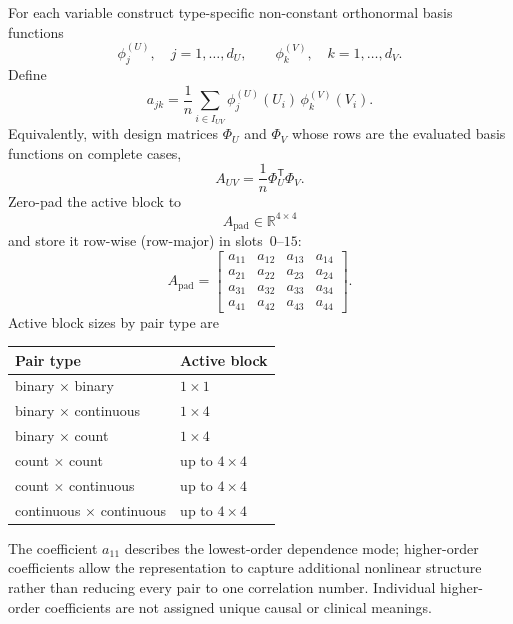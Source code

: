 For each variable construct type-specific non-constant orthonormal basis functions
\begin{equation}
\phi^{(U)}_{j},\quad j=1,\ldots,d_{U},
\qquad
\phi^{(V)}_{k},\quad k=1,\ldots,d_{V}.
\end{equation}
Define
\begin{equation}
\label{eq:app-ajk}
a_{jk}
=
\frac{1}{n}
\sum_{i\in I_{UV}}
\phi^{(U)}_{j}(U_i)\,
\phi^{(V)}_{k}(V_i).
\end{equation}
Equivalently, with design matrices $\Phi_U$ and $\Phi_V$ whose rows are the evaluated basis functions on complete cases,
\begin{equation}
A_{UV}=\frac{1}{n}\Phi_U^{\mathsf{T}}\Phi_V.
\end{equation}
Zero-pad the active block to
\begin{equation}
A_{\mathrm{pad}}\in\mathbb{R}^{4\times 4}
\end{equation}
and store it row-wise (row-major) in slots~$0$--$15$:
\begin{equation}
A_{\mathrm{pad}}
=
\begin{bmatrix}
a_{11} & a_{12} & a_{13} & a_{14}\\
a_{21} & a_{22} & a_{23} & a_{24}\\
a_{31} & a_{32} & a_{33} & a_{34}\\
a_{41} & a_{42} & a_{43} & a_{44}
\end{bmatrix}.
\end{equation}
Active block sizes by pair type are
\begin{center}
\begin{tabular}{@{}ll@{}}
\toprule
Pair type & Active block \\
\midrule
binary $\times$ binary & $1\times 1$ \\
binary $\times$ continuous & $1\times 4$ \\
binary $\times$ count & $1\times 4$ \\
count $\times$ count & up to $4\times 4$ \\
count $\times$ continuous & up to $4\times 4$ \\
continuous $\times$ continuous & up to $4\times 4$ \\
\bottomrule
\end{tabular}
\end{center}
The coefficient $a_{11}$ describes the lowest-order dependence mode; higher-order coefficients allow the representation to capture additional nonlinear structure rather than reducing every pair to one correlation number.
Individual higher-order coefficients are not assigned unique causal or clinical meanings.

